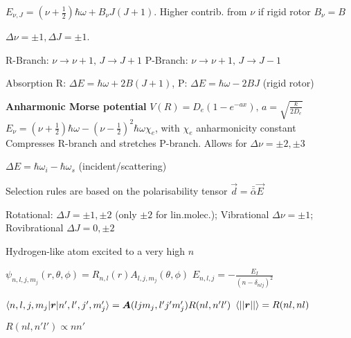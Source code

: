 \begin{squishlist}
    \item $E_{\nu, J} = (\nu + \frac{1}{2}) \hbar \omega + B_{\nu} J(J+1)$. Higher contrib. from $\nu$ \squishsep if rigid rotor $B_{\nu} = B$
    \item $\Delta \nu = \pm 1, \Delta J = \pm 1$.
    \item R-Branch: $\nu \rightarrow \nu + 1,\, J \rightarrow J+1$ \quad P-Branch:  $\nu \rightarrow \nu + 1, \,  J \rightarrow J-1$
    \item Absorption \quad R: $\Delta E = \hbar \omega + 2B(J+1)$, P: $\Delta E = \hbar \omega - 2BJ$ (rigid rotor)
    \item \textbf{Anharmonic Morse potential} $V(R) = D_e (1 - e^{-ax}), \, a = \sqrt{\frac{k}{2D_e}}$ \\
    $E_{\nu} = (\nu+\frac{1}{2}) \hbar \omega - (\nu - \frac{1}{2})^2 \hbar \omega \chi_e$, with $\chi_e$ anharmonicity constant \\
    Compresses R-branch and stretches P-branch. Allows for $\Delta \nu = \pm 2, \pm 3$
\end{squishlist}

\begin{squishlist}
    \item $\Delta E = \hbar \omega_i - \hbar \omega_s$ (incident/scattering)
    \item Selection rules are based on the polarisability tensor $\vec{d} = \bar{\bar{\alpha}} \vec{E}$
    \item Rotational: $\Delta J = \pm 1, \pm 2$ (only $\pm 2$ for lin.molec.); Vibrational $\Delta \nu  =\pm 1$; \\ Rovibrational $\Delta J = 0, \pm 2$
\end{squishlist}

Hydrogen-like atom excited to a very high $n$
\begin{squishlist}
    \item $\psi_{n,l,j,m_j}(r,\theta, \phi) = R_{n,l}(r) A_{l,j,m_j}(\theta,\phi)$ \quad $E_{n,l,j} = - \frac{E_I}{(n - \delta_{nlj})^2}$
    \item $\braket{n,l,j,m_j|\bm{r}|n',l',j',m_j'} = \bm{A}(ljm_j, l'j'm_j')R(nl,n'l')$ \quad $\braket{||\bm{r}||} = R(nl,nl)$
    \item $R(nl,n'l') \propto nn'$
\end{squishlist}



